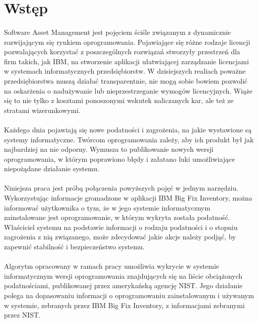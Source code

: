 \documentclass[a4paper,12pt,twoside]{article}
\begin{document}
\newpage
\section*{Wstęp}
\paragraph{}
    Software Asset Management jest pojęciem ściśle związanym z dynamicznie rozwijającym się rynkiem oprogramowania. Pojawiające się różne rodzaje licencji pozwalających korzystać z poszczególnych rozwiązań stworzyły przestrzeń dla firm takich, jak IBM, na stworzenie aplikacji ułatwiającej zarządzanie licencjami w systemach informatycznych przedsiębiorstw. W dzisiejszych realiach poważne przedsiębiorstwa muszą działać transparentnie, nie mogą sobie bowiem pozwolić na oskarżenia o nadużywanie lub nieprzestrzeganie wymogów licencyjnych. Wiąże się to nie tylko z kosztami ponoszonymi wskutek naliczanych kar, ale też ze stratami wizerunkowymi.

    \paragraph{}
    Każdego dnia pojawiają się nowe podatności i zagrożenia, na jakie wystawione są systemy informatyczne. Twórcom oprogramowania zależy, aby ich produkt był jak najbardziej na nie odporny. Wymusza to publikowanie nowych wersji oprogramowania, w którym poprawiono błędy i załatano luki umożliwiające niepożądane działanie systemu.      

    \paragraph{}
    Niniejsza praca jest próbą połączenia powyższych pojęć w jednym narzędziu. Wykorzystując informacje gromadzone w aplikacji IBM Big Fix Inventory, można informować użytkownika o tym, że w jego systemie informatycznym zainstalowane jest oprogramowanie, w którym wykryta została podatność. Właściciel systemu na podstawie informacji o rodzaju podatności i o stopniu zagrożenia z nią związanego, może zdecydować jakie akcje należy podjąć, by zapewnić stabilność i bezpieczeństwo systemu.

    \paragraph{}
    Algorytm opracowany w ramach pracy umożliwia wykrycie w systemie informatycznym wersji oprogramowania znajdujących się na liście obciążonych podatnościami, publikowanej przez amerykańską agencję NIST. Jego działanie polega na dopasowaniu informacji o oprogramowaniu zainstalowanym i używanym w systemie, zebranych przez IBM Big Fix Inventory, z informacjami zebranymi przez NIST.    
    
\end{document}
